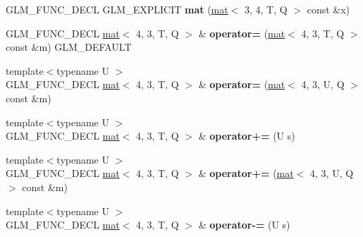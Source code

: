 \begin{DoxyCompactItemize}
\mbox{\label{structglm_1_1mat_3_014_00_013_00_01T_00_01Q_01_4_af2b5f8f348ef9195fe62c0a956e0e733}} 
G\+L\+M\+\_\+\+F\+U\+N\+C\+\_\+\+D\+E\+CL G\+L\+M\+\_\+\+E\+X\+P\+L\+I\+C\+IT {\bfseries mat} (\hyperlink{structglm_1_1mat}{mat}$<$ 3, 4, T, Q $>$ const \&x)
\item 
\mbox{\label{structglm_1_1mat_3_014_00_013_00_01T_00_01Q_01_4_afaa965a21b27d65f815f152611436e68}} 
G\+L\+M\+\_\+\+F\+U\+N\+C\+\_\+\+D\+E\+CL \hyperlink{structglm_1_1mat}{mat}$<$ 4, 3, T, Q $>$ \& {\bfseries operator=} (\hyperlink{structglm_1_1mat}{mat}$<$ 4, 3, T, Q $>$ const \&m) G\+L\+M\+\_\+\+D\+E\+F\+A\+U\+LT
\item 
\mbox{\label{structglm_1_1mat_3_014_00_013_00_01T_00_01Q_01_4_a21fe88fb378d3c86a5b74f4b6717cc46}} 
{\footnotesize template$<$typename U $>$ }\\G\+L\+M\+\_\+\+F\+U\+N\+C\+\_\+\+D\+E\+CL \hyperlink{structglm_1_1mat}{mat}$<$ 4, 3, T, Q $>$ \& {\bfseries operator=} (\hyperlink{structglm_1_1mat}{mat}$<$ 4, 3, U, Q $>$ const \&m)
\item 
\mbox{\label{structglm_1_1mat_3_014_00_013_00_01T_00_01Q_01_4_afd8c591747fffe69889f28170bf76294}} 
{\footnotesize template$<$typename U $>$ }\\G\+L\+M\+\_\+\+F\+U\+N\+C\+\_\+\+D\+E\+CL \hyperlink{structglm_1_1mat}{mat}$<$ 4, 3, T, Q $>$ \& {\bfseries operator+=} (U s)
\item 
\mbox{\label{structglm_1_1mat_3_014_00_013_00_01T_00_01Q_01_4_aa7b86eac813820bbca325d7ac853e612}} 
{\footnotesize template$<$typename U $>$ }\\G\+L\+M\+\_\+\+F\+U\+N\+C\+\_\+\+D\+E\+CL \hyperlink{structglm_1_1mat}{mat}$<$ 4, 3, T, Q $>$ \& {\bfseries operator+=} (\hyperlink{structglm_1_1mat}{mat}$<$ 4, 3, U, Q $>$ const \&m)
\item 
\mbox{\label{structglm_1_1mat_3_014_00_013_00_01T_00_01Q_01_4_a88092ec48acadaf5147db1f4d9fdd964}} 
{\footnotesize template$<$typename U $>$ }\\G\+L\+M\+\_\+\+F\+U\+N\+C\+\_\+\+D\+E\+CL \hyperlink{structglm_1_1mat}{mat}$<$ 4, 3, T, Q $>$ \& {\bfseries operator-\/=} (U s)

\end{DoxyCompactItemize}
